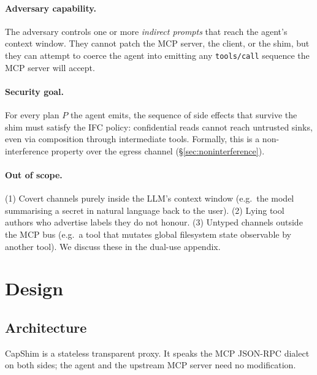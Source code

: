 \documentclass[11pt,a4paper]{article}
\begin{document}
\paragraph{Adversary capability.} The adversary controls one or more
\emph{indirect prompts} that reach the agent's context window. They
cannot patch the MCP server, the client, or the shim, but they can
attempt to coerce the agent into emitting any \texttt{tools/call}
sequence the MCP server will accept.

\paragraph{Security goal.} For every plan $P$ the agent emits, the
sequence of side effects that survive the shim must satisfy the IFC
policy: confidential reads cannot reach untrusted sinks, even via
composition through intermediate tools. Formally, this is a
non-interference property over the egress channel
(\S\ref{sec:noninterference}).

\paragraph{Out of scope.} (1) Covert channels purely inside the LLM's
context window (e.g.\ the model summarising a secret in natural
language back to the user). (2) Lying tool authors who advertise
labels they do not honour. (3) Untyped channels outside the MCP bus
(e.g.\ a tool that mutates global filesystem state observable by
another tool). We discuss these in the dual-use appendix.

\section{Design}

\subsection{Architecture}

CapShim is a stateless transparent proxy. It speaks the MCP JSON-RPC
dialect on both sides; the agent and the upstream MCP server need no
modification.
\end{document}
